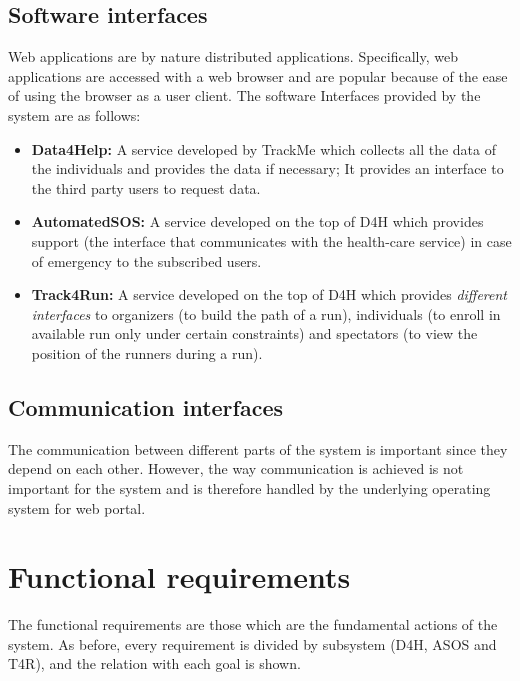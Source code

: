 \documentclass[a4paper, hidelinks, 12pt]{report}
\begin{document}
	\subsection{Software interfaces}
	Web applications are by nature distributed applications. Specifically, web applications are accessed with a web browser and are popular because of the ease of using the browser as a user client. The software Interfaces provided by the system are as follows:\\
	
	\begin{itemize}
		\item{} \textbf{Data4Help:} A service developed by TrackMe which collects all the data of the individuals and provides the data if necessary; It provides an interface to the third party users to request data.
		\item{} \textbf{AutomatedSOS:} A service developed on the top of D4H which provides support (the interface that communicates with the health-care service) in case of emergency to the subscribed users.
		\item{} \textbf{Track4Run:} A service developed on the top of D4H  which provides \textit{different interfaces} to organizers (to build the path of a run), individuals (to enroll in available run only under certain constraints) and spectators (to view the position of the runners during a run).
	\end{itemize}
	
	\subsection{Communication interfaces}
	The communication between different parts of the system is important since they depend on each other. However, the way communication is achieved is not important for the system and is therefore handled by the underlying operating system for web portal.
	
	\section{Functional requirements}
	The functional requirements are those which are the fundamental actions of the system. As before, every requirement is divided by subsystem (D4H, ASOS and T4R), and the relation with each goal is shown.
	
\end{document}
